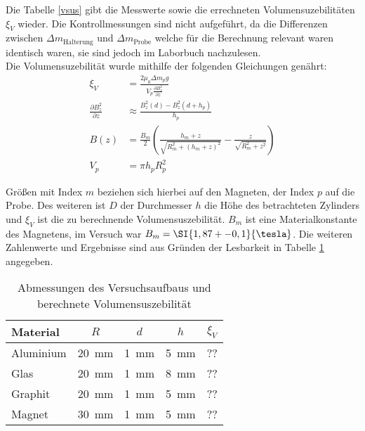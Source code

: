 Die Tabelle \ref{vsus} gibt die Messwerte sowie die errechneten Volumensuzebilitäten $\xi_V$ wieder. Die Kontrollmessungen sind nicht aufgeführt, da die Differenzen zwischen $\Delta m_{\textrm{Halterung}}$ und $\Delta m_{\textrm{Probe}}$ welche für die Berechnung relevant waren identisch waren, sie sind jedoch im Laborbuch nachzulesen.\\
Die Volumensuzebilität wurde mithilfe der folgenden Gleichungen genährt:
\begin{align}
	\xi_V &= \frac{2 \mu_0 \Delta m_p g}{V_p \frac{\partial B_z^2}{\partial z}}
	\\
	\frac{\partial B_z^2}{\partial z} &\approx \frac{B_z^2(d)-B_z^2(d+h_p)}{h_p}
	\\
	B(z) &=\frac{B_m}{2}\left( \frac{h_m+z}{\sqrt{R_m^2+(h_m+z)^2}}- \frac{z}{\sqrt{R_m^2+z^2}}\right)\\
	V_p &=\pi h_p R_p^2 
\end{align}

Größen mit Index $m$ beziehen sich hierbei auf den Magneten, der Index $p$ auf die Probe. Des weiteren ist $D$ der Durchmesser $h$ die Höhe des betrachteten Zylinders und $\xi_V$ ist die zu berechnende Volumensuszebilität. $B_m$ ist eine Materialkonstante des Magnetens, im Versuch war $B_m=\SI{1,87+-0,1}{\tesla}$. Die weiteren Zahlenwerte und Ergebnisse sind aus Gründen der Lesbarkeit in Tabelle \ref{berechnung} angegeben.





\begin{table}
	\caption{Abmessungen des Versuchsaufbaus und berechnete Volumensuszebilität}
	\begin{center}
		
		
		\begin{tabular}{|l|c|c|c|c|}
			
			\hline
			Material& $R$ & $d$ & $h$ & $\xi_V$\\
			\hline
			Aluminium &\SI{20}{mm}&\SI{1}{mm}&\SI{5}{mm}& ??\\
			\hline
			Glas &\SI{20}{mm}&\SI{1}{mm}&\SI{8}{mm}& ??\\
			 \hline
			Graphit &\SI{20}{mm}&\SI{1}{mm}&\SI{5}{mm}& ??\\
			\hline
			Magnet &\SI{30}{mm}&\SI{1}{mm}&\SI{5}{mm}& ??\\
			\hline
		\end{tabular}
	\end{center}
	\label{berechnung}
	
\end{table}






